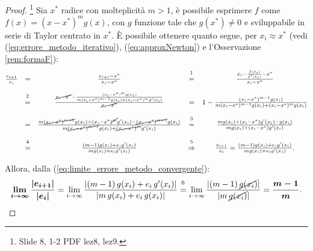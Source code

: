 \begin{proof}\footnote{Slide 8, 1-2 PDF lez8, lez9.}
	Sia $x^*$ radice con molteplicità $m>1$, è possibile esprimere $f$ come $f(x)=(x-x^*)^mg(x)$, con $g$ funzione tale che $g(x^*)\neq 0$ e sviluppabile in serie di Taylor centrato in $x^*$. È possibile ottenere quanto segue, per $x_i\approx x^*$ (vedi (\ref{eq:errore_metodo_iterativo}), (\ref{eq:approxNewton}) e l'Osservazione \ref{rem:formaF}): 
	\begin{equation*}
		\begin{matrix}
			\frac{e_{i+1}}{e_i}&=&\frac{x_{i+i}-x^*}{x_i-x^*}&\overset{\footnotemark}{=}&\frac{x_i-\frac{f(x_i)}{f'(x_i)}-x^*}{x_i-x^*}\\\\
			&\overset{\footnotemark}{=}&\frac{\cancel{x_i-x^*}-\frac{(x_i-x^*)^mg(x_i)}{m{(x_i-x^*)^{m-1}}g(x_i)+(x_i-x^*)^mg'(x_i)}}{\cancel{x_i-x^*}}&=&1-\frac{(x_i-x^*)^{m-1}g(x_i)}{m(x_i-x^*)^{m-1}g(x_i)+(x_i-x^*)^mg(x_i)}\\\\
			&=&\frac{m(\cancel{x_i-x^*)^{m-1}}g(x_i)+(x_i-x^*)^{\cancel{m}}g'(x_i)-\cancel{(x_i-x^*)^{m-1}}g(x_i)}{m\cancel{(x_i-x^*)^{m-1}}g(x_i)+\cancel{(x_i-x^*)^m}g'(x_i)}&\overset{\footnotemark}{=}&\frac{mg(x_i)+(x_i-x^*)g'(x_i)-g(x_i)}{mg(x_i)+(x_i-x^*)g'(x_i)}\\\\
			&\overset{\footnotemark}{=}&\frac{(m-1)g(x_i)+e_ig'(x_i)}{mg(x_i)+e_ig'(x_i)}&\overset{\footnotemark}{\Rightarrow}&\frac{e_{i+1}}{e_i}=\frac{(m-1)g(x_i)+e_ig'(x_i)}{mg(x_i)+e_ig'(x_i)}.
		\end{matrix}
	\end{equation*}
	
	\addtocounter{footnote}{-4}
	
	
	
	
	
	
	\noindent Allora, dalla (\ref{eq:limite_errore_metodo_convergente}):
	\begin{equation} \label{eq:limCostanteAsistotica}
		\boldsymbol{\lim_{i\to\infty}{\frac{|e_{i+1}|}{|e_i|}}}=\lim_{i\to\infty}{\frac{|(m-1)\,g(x_i)+e_i\,g'(x_i)|}{|m\,g(x_i)+e_i\,g(x_i)|}}\overset{\footnotemark}{=}\lim_{i\to\infty}{\frac{|(m-1)\,\cancel{g(x_i)}|}{|m\,\cancel{g(x_i)}|}}=\boldsymbol{\frac{m-1}{m}}.
	\end{equation}
	

\end{proof}
